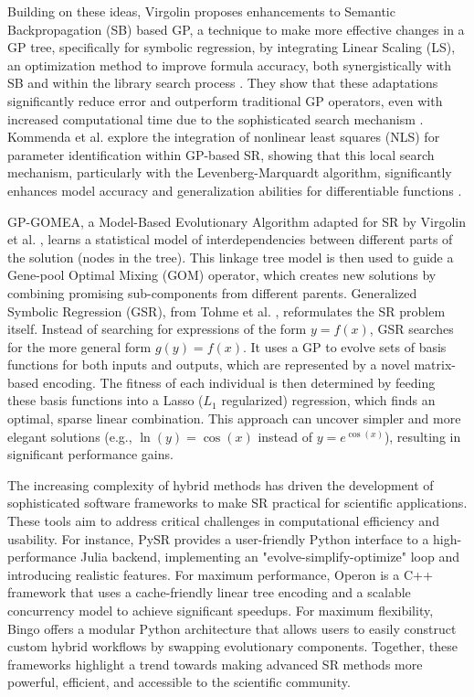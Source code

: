Building on these ideas, Virgolin \cite{virgolin_improving_2019} proposes enhancements to Semantic Backpropagation (SB) based GP, a technique to make more effective changes in a GP tree, specifically for symbolic regression, by integrating Linear Scaling (LS), an optimization method to improve formula accuracy, both synergistically with SB and within the library search process \cite{virgolin2019linear}. They show that these adaptations significantly reduce error and outperform traditional GP operators, even with increased computational time due to the sophisticated search mechanism \cite{virgolin2019linear}. Kommenda et al. explore the integration of nonlinear least squares (NLS) for parameter identification within GP-based SR, showing that this local search mechanism, particularly with the Levenberg-Marquardt algorithm, significantly enhances model accuracy and generalization abilities for differentiable functions \cite{kommenda2020parameter}. 

GP-GOMEA, a Model-Based Evolutionary Algorithm adapted for SR by Virgolin et al. \cite{virgolin_improving_2019}, learns a statistical model of interdependencies between different parts of the solution (nodes in the tree). This linkage tree model is then used to guide a Gene-pool Optimal Mixing (GOM) operator, which creates new solutions by combining promising sub-components from different parents. Generalized Symbolic Regression (GSR), from Tohme et al. \cite{tohme2022gsr}, reformulates the SR problem itself. Instead of searching for expressions of the form $y = f(x)$, GSR searches for the more general form $g(y) = f(x)$. It uses a GP to evolve sets of basis functions for both inputs and outputs, which are represented by a novel matrix-based encoding. The fitness of each individual is then determined by feeding these basis functions into a Lasso ($L_1$ regularized) regression, which finds an optimal, sparse linear combination. This approach can uncover simpler and more elegant solutions (e.g., $\ln(y) = \cos(x)$ instead of $y = e^{\cos(x)}$), resulting in significant performance gains.
 
The increasing complexity of hybrid methods has driven the development of sophisticated software frameworks to make SR practical for scientific applications. These tools aim to address critical challenges in computational efficiency and usability. For instance, PySR provides a user-friendly Python interface to a high-performance Julia backend, implementing an "evolve-simplify-optimize" loop and introducing realistic features. For maximum performance, Operon is a C++ framework that uses a cache-friendly linear tree encoding and a scalable concurrency model to achieve significant speedups. For maximum flexibility, Bingo offers a modular Python architecture that allows users to easily construct custom hybrid workflows by swapping evolutionary components. Together, these frameworks highlight a trend towards making advanced SR methods more powerful, efficient, and accessible to the scientific community.

